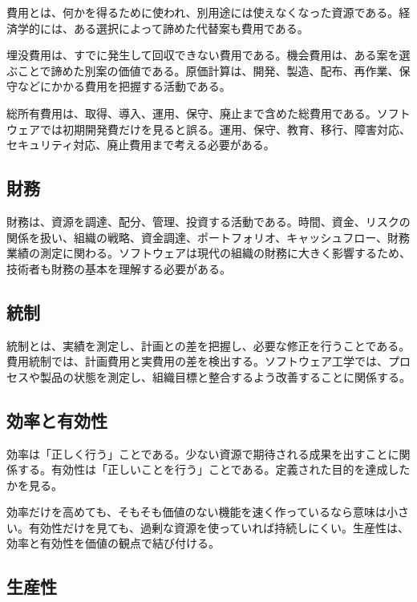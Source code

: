 \documentclass[a4paper,11pt]{article}
\begin{document}
費用とは、何かを得るために使われ、別用途には使えなくなった資源である。経済学的には、ある選択によって諦めた代替案も費用である。

埋没費用は、すでに発生して回収できない費用である。機会費用は、ある案を選ぶことで諦めた別案の価値である。原価計算は、開発、製造、配布、再作業、保守などにかかる費用を把握する活動である。

総所有費用は、取得、導入、運用、保守、廃止まで含めた総費用である。ソフトウェアでは初期開発費だけを見ると誤る。運用、保守、教育、移行、障害対応、セキュリティ対応、廃止費用まで考える必要がある。

\subsection{財務}

財務は、資源を調達、配分、管理、投資する活動である。時間、資金、リスクの関係を扱い、組織の戦略、資金調達、ポートフォリオ、キャッシュフロー、財務業績の測定に関わる。ソフトウェアは現代の組織の財務に大きく影響するため、技術者も財務の基本を理解する必要がある。

\subsection{統制}

統制とは、実績を測定し、計画との差を把握し、必要な修正を行うことである。費用統制では、計画費用と実費用の差を検出する。ソフトウェア工学では、プロセスや製品の状態を測定し、組織目標と整合するよう改善することに関係する。

\subsection{効率と有効性}

効率は「正しく行う」ことである。少ない資源で期待される成果を出すことに関係する。有効性は「正しいことを行う」ことである。定義された目的を達成したかを見る。

\begin{termnote}
効率だけを高めても、そもそも価値のない機能を速く作っているなら意味は小さい。有効性だけを見ても、過剰な資源を使っていれば持続しにくい。生産性は、効率と有効性を価値の観点で結び付ける。
\end{termnote}

\subsection{生産性}
\end{document}
